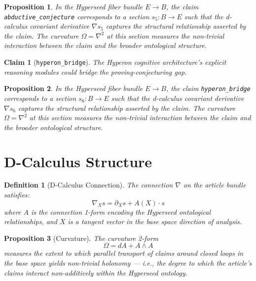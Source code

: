 \documentclass{article}
\newtheorem{claim}{Claim}
\newtheorem{definition}{Definition}
\newtheorem{proposition}{Proposition}
\begin{document}
\begin{proposition}
In the Hyperseed fiber bundle $E \to B$, the claim \texttt{abductive_conjecture} corresponds to a section $s_5: B \to E$ such that the d-calculus covariant derivative $\nabla s_5$ captures the structural relationship asserted by the claim. The curvature $\Omega = \nabla^2$ at this section measures the non-trivial interaction between the claim and the broader ontological structure.
\end{proposition}

\begin{claim}[\texttt{hyperon_bridge}]
The Hyperon cognitive architecture's explicit reasoning modules could bridge the proving-conjecturing gap.
\end{claim}

\begin{proposition}
In the Hyperseed fiber bundle $E \to B$, the claim \texttt{hyperon_bridge} corresponds to a section $s_6: B \to E$ such that the d-calculus covariant derivative $\nabla s_6$ captures the structural relationship asserted by the claim. The curvature $\Omega = \nabla^2$ at this section measures the non-trivial interaction between the claim and the broader ontological structure.
\end{proposition}

\section{D-Calculus Structure}

\begin{definition}[D-Calculus Connection]
The connection $\nabla$ on the article bundle satisfies:
\begin{equation}
  \nabla_X s = \partial_X s + A(X) \cdot s
\end{equation}
where $A$ is the connection 1-form encoding the Hyperseed ontological relationships, and $X$ is a tangent vector in the base space direction of analysis.
\end{definition}

\begin{proposition}[Curvature]
The curvature 2-form
\begin{equation}
  \Omega = dA + A \wedge A
\end{equation}
measures the extent to which parallel transport of claims around closed loops in the base space yields non-trivial holonomy --- i.e., the degree to which the article's claims interact non-additively within the Hyperseed ontology.
\end{proposition}
\end{document}
